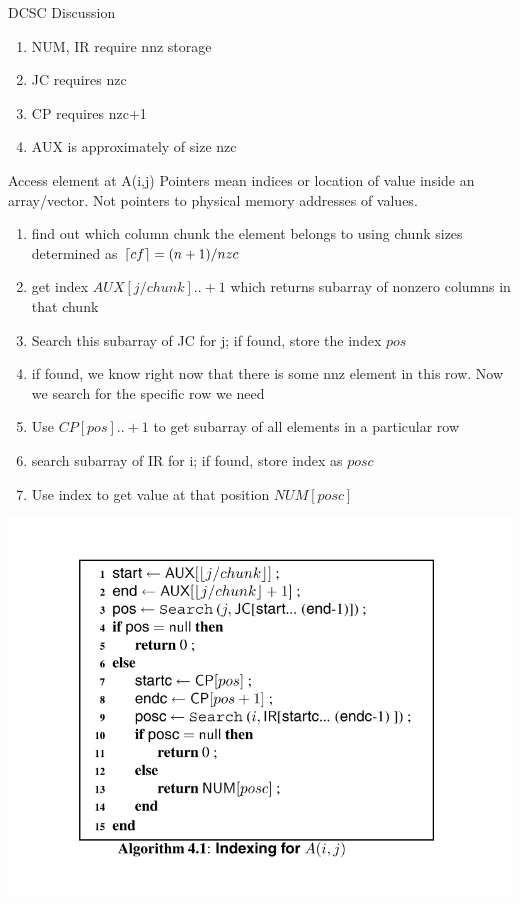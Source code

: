 \documentclass[12pt, usenames, dvipsnames, table]{beamer}
\DeclarePairedDelimiter\ceil{\lceil}{\rceil}
\begin{document}
\begin{frame}[fragile]{DCSC Discussion}
	\begin{enumerate}
		\item NUM, IR require nnz storage
		\item JC requires nzc
		\item CP requires nzc+1
		\item AUX is approximately of size nzc
	\end{enumerate}
\end{frame}

\begin{frame}{Access element at A(i,j)}
Pointers mean indices or location of value inside an array/vector. Not pointers to physical memory addresses of values.
	\begin{enumerate} 
		\item find out which column chunk the element belongs to using chunk sizes determined as $\ceil{cf} = (n+1)/nzc$
		\item get index $AUX[j/chunk]..+1$ which returns subarray of nonzero columns in that chunk
		\item Search this subarray of JC for j; if found, store the index $pos$
		\item if found, we know right now that there is some nnz element in this row. Now we search for the specific row we need
		\item Use $CP[pos]..+1$ to get subarray of all elements in a particular row
		\item search subarray of IR for i; if found, store index as $posc$
		\item Use index to get value at that position $NUM[posc]$
	\end{enumerate}
\end{frame}

\begin{frame}
\begin{center}
	\includegraphics[scale=0.4]{index.png}
\end{center}
\end{frame}
\end{document}
